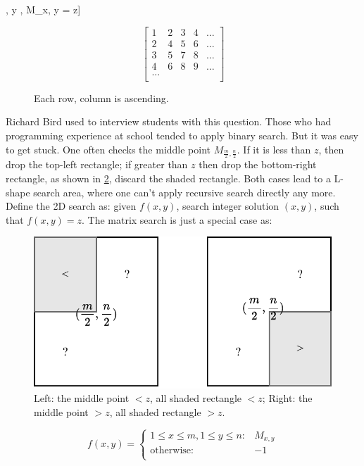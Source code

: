 \documentclass[b5paper]{article}
\begin{document}
\be
[(x, y) | x \gets [1, 2,..., m], y \gets [1, 2,..., n], M_{x, y} = z]
\label{eq:bsearch-brute}
\ee

\begin{figure}[htbp]
 \centering
\[
\left [
  \begin{array}{ccccc}
    1 & 2 & 3 & 4 & ... \\
    2 & 4 & 5 & 6 & ... \\
    3 & 5 & 7 & 8 & ... \\
    4 & 6 & 8 & 9 & ... \\
    ... \\
  \end{array}
\right ]
\]
\caption{Each row, column is ascending.}
\label{fig:matrix-eg}
\end{figure}

Richard Bird used to interview students with this question\cite{fp-pearls}. Those who had programming experience at school tended to apply binary search. But it was easy to get stuck. One often checks the middle point $M_{\frac{m}{2}, \frac{n}{2}}$. If it is less than $z$, then drop the top-left rectangle; if greater than $z$ then drop the bottom-right rectangle, as shown in \cref{fig:bsearch-2D}, discard the shaded rectangle. Both cases lead to a L-shape search area, where one can't apply recursive search directly any more. Define the 2D search as: given $f(x, y)$, search integer solution $(x, y)$, such that $f(x, y) = z$. The matrix search is just a special case as:

\begin{figure}[htbp]
 \centering
 \includegraphics[scale=0.5]{img/binary-search-2d}
 \caption{Left: the middle point $< z$, all shaded rectangle $< z$; Right: the middle point $> z$, all shaded rectangle $> z$.}
 \label{fig:bsearch-2D}
\end{figure}

\[
f(x, y) = \begin{cases}
  1 \leq x \leq m, 1 \leq y \leq n: & M_{x, y} \\
  \text{otherwise}: & -1 \\
  \end{cases}
\]
\end{document}
